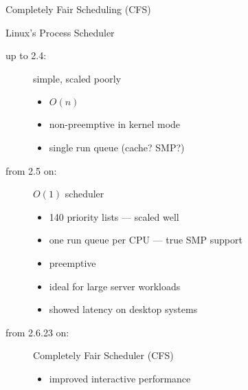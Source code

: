 \begin{frame}{Completely Fair Scheduling (CFS)}
  \begin{block}{Linux's Process Scheduler}
    \begin{description}
    \item[up to 2.4:] simple, scaled poorly
      \begin{multicols}{2}
        \begin{itemize}
        \item $O(n)$
        \item non-preemptive in kernel mode
        \item single run queue (cache? SMP?)
        \end{itemize}
      \end{multicols}
    \item[from 2.5 on:] $O(1)$ scheduler
      \begin{itemize}
      \item[\good] 140 priority lists --- scaled well
      \item[\good] one run queue per CPU --- true SMP support
      \item[\good] preemptive
      \item[\good] ideal for large server workloads
      \item[\textcolor{red}{\bad}] showed latency on desktop systems
      \end{itemize}
    \item[from 2.6.23 on:] Completely Fair Scheduler (CFS)
      \begin{itemize}
      \item[\good] improved interactive performance
      \end{itemize}
    \end{description}
  \end{block}
\end{frame}



